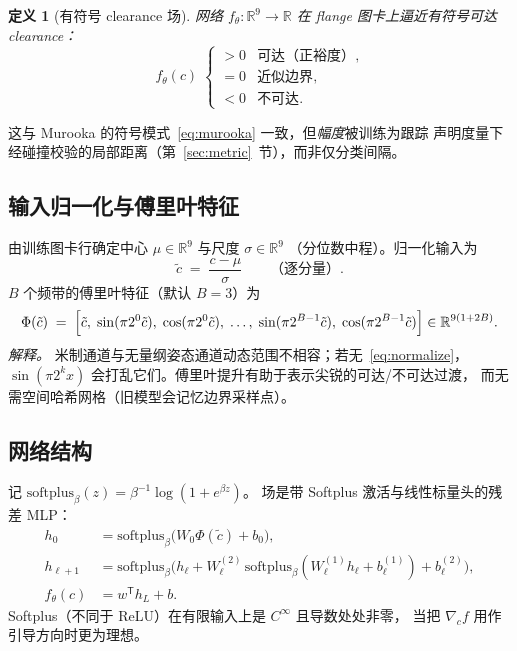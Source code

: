 \documentclass[UTF8,a4paper,11pt,fontset=fandol]{ctexart}
\newtheorem{definition}{定义}
\newcommand{\R}{\mathbb{R}}
\begin{document}
\begin{definition}[有符号 clearance 场]
网络 \(f_{\theta}:\R^{9}\to\R\) 在 flange 图卡上逼近有符号可达 clearance：
\begin{equation}
\label{eq:sign-convention}
  f_{\theta}(c)
  \;
  \begin{cases}
    >0 & \text{可达（正裕度）},\\
    =0 & \text{近似边界},\\
    <0 & \text{不可达}.
  \end{cases}
\end{equation}
\end{definition}
这与 Murooka 的符号模式~\eqref{eq:murooka} 一致，但\emph{幅度}被训练为跟踪
声明度量下经碰撞校验的局部距离（第~\ref{sec:metric}~节），而非仅分类间隔。

\subsection{输入归一化与傅里叶特征}
\label{sec:fourier}

由训练图卡行确定中心 \(\mu\in\R^{9}\) 与尺度 \(\sigma\in\R^{9}\)
（分位数中程）。归一化输入为
\begin{equation}
\label{eq:normalize}
  \tilde c
  \;=\;
  \frac{c-\mu}{\sigma}
  \qquad
  \text{（逐分量）}.
\end{equation}
\(B\) 个频带的傅里叶特征（默认 \(B{=}3\)）为
\begin{equation}
\label{eq:fourier}
  \Phi(\tilde c)
  \;=\;
  \Bigl[
    \tilde c,\;
    \sin(\pi 2^{0}\tilde c),\;
    \cos(\pi 2^{0}\tilde c),\;
    \ldots,\;
    \sin(\pi 2^{B-1}\tilde c),\;
    \cos(\pi 2^{B-1}\tilde c)
  \Bigr]
  \in\R^{9(1+2B)}.
\end{equation}
\emph{解释。}
米制通道与无量纲姿态通道动态范围不相容；若无~\eqref{eq:normalize}，
\(\sin(\pi 2^{k}x)\) 会打乱它们。傅里叶提升有助于表示尖锐的可达/不可达过渡，
而无需空间哈希网格（旧模型会记忆边界采样点）。

\subsection{网络结构}
\label{sec:mlp}

记 \(\mathrm{softplus}_{\beta}(z)=\beta^{-1}\log(1+e^{\beta z})\)。
场是带 Softplus 激活与线性标量头的残差 MLP：
\begin{equation}
\label{eq:mlp}
\begin{aligned}
  h_{0}
  &=
  \mathrm{softplus}_{\beta}\bigl(W_{0}\Phi(\tilde c)+b_{0}\bigr),
  \\
  h_{\ell+1}
  &=
  \mathrm{softplus}_{\beta}\bigl(
    h_{\ell}+W_{\ell}^{(2)}\,
    \mathrm{softplus}_{\beta}(W_{\ell}^{(1)}h_{\ell}+b_{\ell}^{(1)})
    +b_{\ell}^{(2)}
  \bigr),
  \\
  f_{\theta}(c)
  &=
  w^{\mathsf T}h_{L}+b.
\end{aligned}
\end{equation}
Softplus（不同于 ReLU）在有限输入上是 \(C^{\infty}\) 且导数处处非零，
当把 \(\nabla_{c}f\) 用作引导方向时更为理想。
\end{document}
